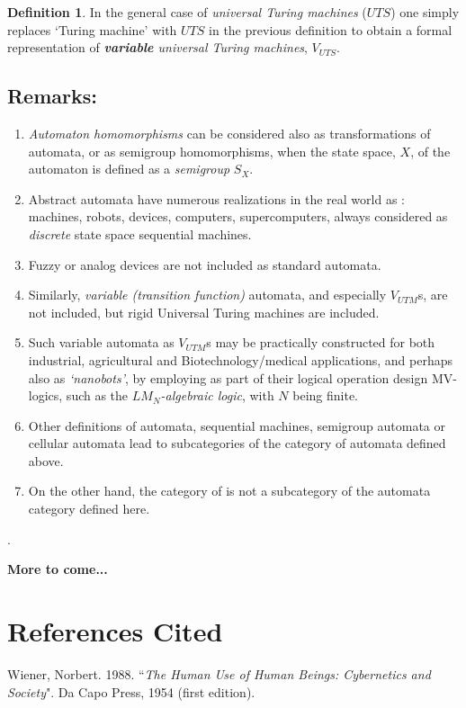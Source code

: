 \documentclass[12pt]{article}
\theoremstyle{plain}
\theoremstyle{definition}
\newtheorem{definition}{Definition}[section]
\numberwithin{equation}{section}
\begin{document}
\begin{definition}
In the general case of {\em universal Turing machines} ($UTS$) one simply replaces `Turing machine' with $UTS$ in the previous definition to obtain a formal representation of {\em {\bf variable} universal Turing machines}, $V_{UTS}$.
\end{definition}


\bigbreak
\subsection{Remarks:} 
\begin{enumerate}
\item {\em Automaton homomorphisms} can be considered also as  transformations of automata, or as semigroup homomorphisms, when the state space, $X$, of the automaton is defined as a {\em semigroup} $S_X$. 
\item Abstract automata have numerous realizations in the real world as : machines, robots, devices,
computers, supercomputers, always considered as \emph{discrete} state space sequential machines.
\item Fuzzy or analog devices are not included as standard automata.
\item Similarly, \emph{variable (transition function)} automata, and especially $V_{UTM}$s, are not included, but rigid Universal Turing machines are included.
\item Such variable automata as $V_{UTM}$s may be practically constructed for both industrial, agricultural and Biotechnology/medical applications, and perhaps also as {\em `nanobots'}, by employing as part of their logical operation design MV-logics, such as the {\em $LM_N$-algebraic logic}, with $N$ being finite. 
\item Other definitions of automata, sequential machines, semigroup automata or cellular automata lead to subcategories of the category of automata defined above. 
\item On the other hand, the category of  is not a subcategory of the automata category defined here.
\end{enumerate}.




{\bf More to come...}

\section{References Cited}

 Wiener, Norbert. 1988. ``{\em The Human Use of Human Beings: Cybernetics and Society}". Da Capo Press, 1954 (first edition).

\end{document}
